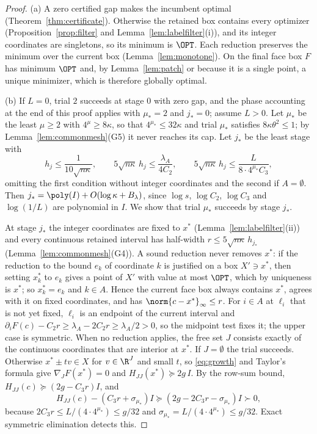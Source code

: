 \begin{proof}
(a) A zero certified gap makes the incumbent optimal
(Theorem~\ref{thm:certificate}). Otherwise the retained box contains every
optimizer (Proposition~\ref{prop:filter} and Lemma~\ref{lem:labelfilter}(i)),
and its integer coordinates are singletons, so its minimum is $\OPT$. Each
reduction preserves the minimum over the current box
(Lemma~\ref{lem:monotone}). On the final face box $F$ has minimum $\OPT$ and,
by Lemma~\ref{lem:patch} or because it is a single point, a unique minimizer,
which is therefore globally optimal.

(b) If $L=0$, trial $2$ succeeds at stage $0$ with zero gap, and the phase
accounting at the end of this proof applies with $\mu_*=2$ and $j_*=0$;
assume $L>0$.
Let $\mu_*$ be the least $\mu\ge2$ with $4^\mu\ge8\kappa$, so that
$4^{\mu_*}\le32\kappa$ and trial $\mu_*$ satisfies $8\kappa\theta^2\le1$; by
Lemma~\ref{lem:commonmesh}(G5) it never reaches its cap. Let $j_*$ be the least
stage with
\[
h_j\le\frac1{10\sqrt{n\kappa}},\qquad
5\sqrt{n\kappa}\,h_j\le\frac{\lambda_A}{4C_2},\qquad
5\sqrt{n\kappa}\,h_j\le\frac L{8\cdot4^{\mu_*}C_3},
\]
omitting the first condition without integer coordinates and the second if
$A=\emptyset$. Then $j_*=\poly(I)+O(\log\kappa+B_\lambda)$, since
$\log s$, $\log C_2$, $\log C_3$ and $\log(1/L)$ are polynomial in $I$. We
show that trial $\mu_*$ succeeds by stage $j_*$.

At stage $j_*$ the integer coordinates are fixed to $x^*$
(Lemma~\ref{lem:labelfilter}(ii)) and every continuous retained interval has
half-width $r\le5\sqrt{n\kappa}\,h_{j_*}$ (Lemma~\ref{lem:commonmesh}(G4)). A
sound reduction never removes $x^*$: if the reduction to the bound $e_k$ of
coordinate $k$ is justified on a box $X'\ni x^*$, then setting $x^*_k$ to $e_k$
gives a point of $X'$ with value at most $\OPT$, which by uniqueness is $x^*$;
so $x^*_k=e_k$ and $k\in A$. Hence the current face box always
contains $x^*$, agrees with it on fixed coordinates, and has
$\norm{c-x^*}_\infty\le r$. For $i\in A$ at $\ell_i$ that is not yet
fixed, $\ell_i$ is an endpoint of the current interval and
$\partial_iF(c)-C_2r\ge\lambda_A-2C_2r\ge\lambda_A/2>0$, so the midpoint test
fixes it; the upper case is symmetric. When no reduction applies, the free
set $J$ consists exactly of the continuous coordinates that are interior at
$x^*$. If $J=\emptyset$ the trial succeeds. Otherwise $x^*\pm tv\in X$ for
$v\in\R^J$ and small $t$, so \eqref{eq:growth} and Taylor's formula give
$\nabla_JF(x^*)=0$ and $H_{JJ}(x^*)\succeq2g\,I$. By the row-sum bound,
$H_{JJ}(c)\succeq(2g-C_3r)I$, and
\[
H_{JJ}(c)-(C_3r+\sigma_{\mu_*})I\succeq(2g-2C_3r-\sigma_{\mu_*})I
\succ0,
\]
because $2C_3r\le L/(4\cdot4^{\mu_*})\le g/32$ and
$\sigma_{\mu_*}=L/(4\cdot4^{\mu_*})\le g/32$. Exact symmetric elimination
detects this.


\end{proof}
